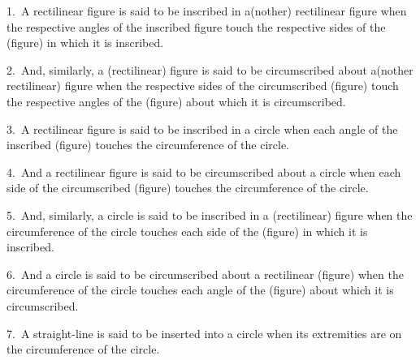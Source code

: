 \begin{Parallel}{}{}
{1.~A rectilinear figure is said to be inscribed in a(nother) rectilinear figure
when  the respective angles of the inscribed figure touch the respective
sides of the (figure) in which it is inscribed.

2.~And, similarly, a  (rectilinear) figure is said to be circumscribed about a(nother rectilinear) figure when the respective sides of the circumscribed
(figure) touch the respective angles of the (figure) about which it is
circumscribed.

3.~A rectilinear figure is said to be inscribed in a circle when
each angle of the inscribed (figure) touches the circumference of the
circle.

4.~And a rectilinear figure is said to be circumscribed about a circle
when each side of the circumscribed (figure) touches the
circumference of the circle.

5.~And, similarly, a circle is said to be inscribed in a (rectilinear) figure
when the circumference of the circle touches each  side of
the (figure) in which it is inscribed.

6.~And a circle is said to be circumscribed about a rectilinear (figure)
when the circumference of the circle touches each  angle of the
(figure) about which it is circumscribed.

7.~A straight-line is said to be inserted into a circle when its extremities
are on the circumference of the circle.}
\end{Parallel}

